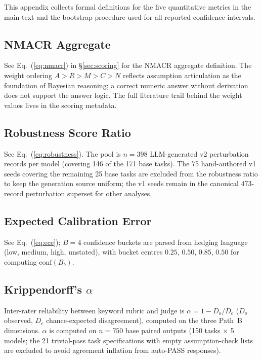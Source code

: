 
\label{app:metrics}

This appendix collects formal definitions for the five quantitative
metrics in the main text and the bootstrap procedure used for all
reported confidence intervals.

\subsection{NMACR Aggregate}

See Eq.~(\ref{eq:nmacr}) in \S\ref{sec:scoring} for the NMACR
aggregate definition. The weight ordering $A > R > M > C > N$
reflects assumption articulation as the foundation of Bayesian
reasoning; a correct numeric answer without derivation does not
support the answer logic. The full literature trail behind the
weight values lives in the scoring metadata.

\subsection{Robustness Score Ratio}

See Eq.~(\ref{eq:robustness}). The pool is $n=398$ LLM-generated
v2 perturbation records per model (covering 146 of the 171 base
tasks). The 75 hand-authored v1 seeds covering the remaining 25
base tasks are excluded from the robustness ratio to keep the
generation source uniform; the v1 seeds remain in the canonical
473-record perturbation superset for other analyses.

\subsection{Expected Calibration Error}

See Eq.~(\ref{eq:ece}); $B = 4$ confidence buckets are parsed from
hedging language (low, medium, high, unstated), with bucket centres
$0.25$, $0.50$, $0.85$, $0.50$ for computing $\mathrm{conf}(B_b)$.

\subsection{Krippendorff's \texorpdfstring{$\alpha$}{alpha}}
\label{appendix:krippendorff}

Inter-rater reliability between keyword rubric and judge is
$\alpha = 1 - D_o / D_e$ ($D_o$ observed, $D_e$ chance-expected
disagreement), computed on the three Path~B dimensions. $\alpha$
is computed on $n=750$ base paired outputs (150 tasks $\times$ 5
models; the 21 trivial-pass task specifications with empty
assumption-check lists are excluded to avoid agreement inflation
from auto-PASS responses).

